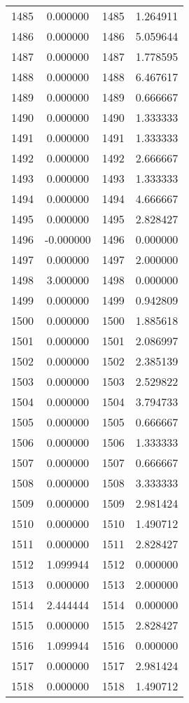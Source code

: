 \documentclass[12pt]{article}
\begin{document}
\begin{longtable}{@{}cccc@{}}
1485 & 0.000000 & 1485 & 1.264911 \\
1486 & 0.000000 & 1486 & 5.059644 \\
1487 & 0.000000 & 1487 & 1.778595 \\
1488 & 0.000000 & 1488 & 6.467617 \\
1489 & 0.000000 & 1489 & 0.666667 \\
1490 & 0.000000 & 1490 & 1.333333 \\
1491 & 0.000000 & 1491 & 1.333333 \\
1492 & 0.000000 & 1492 & 2.666667 \\
1493 & 0.000000 & 1493 & 1.333333 \\
1494 & 0.000000 & 1494 & 4.666667 \\
1495 & 0.000000 & 1495 & 2.828427 \\
1496 & -0.000000 & 1496 & 0.000000 \\
1497 & 0.000000 & 1497 & 2.000000 \\
1498 & 3.000000 & 1498 & 0.000000 \\
1499 & 0.000000 & 1499 & 0.942809 \\
1500 & 0.000000 & 1500 & 1.885618 \\
1501 & 0.000000 & 1501 & 2.086997 \\
1502 & 0.000000 & 1502 & 2.385139 \\
1503 & 0.000000 & 1503 & 2.529822 \\
1504 & 0.000000 & 1504 & 3.794733 \\
1505 & 0.000000 & 1505 & 0.666667 \\
1506 & 0.000000 & 1506 & 1.333333 \\
1507 & 0.000000 & 1507 & 0.666667 \\
1508 & 0.000000 & 1508 & 3.333333 \\
1509 & 0.000000 & 1509 & 2.981424 \\
1510 & 0.000000 & 1510 & 1.490712 \\
1511 & 0.000000 & 1511 & 2.828427 \\
1512 & 1.099944 & 1512 & 0.000000 \\
1513 & 0.000000 & 1513 & 2.000000 \\
1514 & 2.444444 & 1514 & 0.000000 \\
1515 & 0.000000 & 1515 & 2.828427 \\
1516 & 1.099944 & 1516 & 0.000000 \\
1517 & 0.000000 & 1517 & 2.981424 \\
1518 & 0.000000 & 1518 & 1.490712 \\

\end{longtable}
\end{document}
